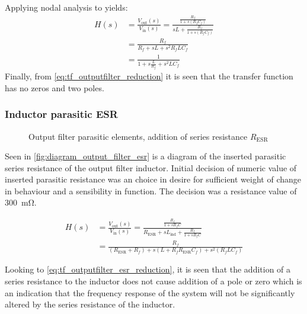 Applying nodal analysis to  yields:
\begin{equation} \label{eq:tf_outputfilter_reduction}
	\begin{split}
		H(s) &= \frac{V_{\mathrm{out}}(s)}{V_{\mathrm{in}}(s)} = \frac{ \frac{R_{f}}{1 + s \left(  R_{f}C_{f} \right) }}{sL + \frac{R_{f}}{1 + s \left(  R_{f}C_{f} \right) }} \\
		&= \frac{R_{f}}{R_{f} + sL + s^{2} R_{f}LC_{f}} \\
		&= \frac{1}{1 + s   \frac{L}{R_{f}}  + s^{2} LC_{f}}
	\end{split}
\end{equation}
Finally, from \autoref{eq:tf_outputfilter_reduction} it is seen that the transfer function has no zeros and two poles.

\subsubsection{Inductor parasitic ESR}
\begin{figure}[htbp]
	\centering
	\begin{circuitikz}
		
	\end{circuitikz}
	\caption{Output filter parasitic elements, addition of series resistance $R_{\mathrm{ESR}}$}
	\label{fig:diagram_output_filter_esr}
\end{figure}
Seen in \autoref{fig:diagram_output_filter_esr} is a diagram of the inserted parasitic series resistance of the output filter inductor. Initial decision of numeric value of inserted parasitic resistance was an choice in desire for sufficient weight of change in behaviour and a sensibility in function. The decision was a resistance value of \SI{300}{\milli\ohm}.

\begin{equation} \label{eq:tf_outputfilter_esr_reduction}
	\begin{split}
		H(s) &= \frac{V_{\mathrm{out}}(s)}{V_{\mathrm{in}}(s)} = \frac{\frac{R_{f}}{1 + sR_{f}C}}{R_{\mathrm{ESR}} + sL_{\mathrm{ind}} + \frac{R_{f}}{1 + sR_{f}C}} \\
		&= \frac{R_{f}}{ \left(  R_{\mathrm{ESR}} + R_{f} \right)  + s(L+R_{f} R_{\mathrm{ESR}}C_{f}) + s^{2} (R_{f}LC_{f})}
	\end{split}
\end{equation}

Looking to \autoref{eq:tf_outputfilter_esr_reduction}, it is seen that the addition of a series resistance to the inductor does not cause addition of a pole or zero which is an indication that the frequency response of the system will not be significantly altered by the series resistance of the inductor.

